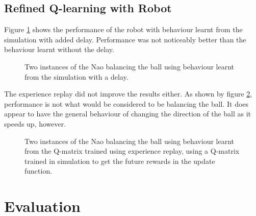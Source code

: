 \documentclass[12pt,a4paper]{article}
\begin{document}



\subsection{Refined Q-learning with Robot}
Figure \ref{delay_noer_1} shows the performance of the robot with behaviour learnt from the simulation with added delay. Performance was not noticeably better than the behaviour learnt without the delay. 
\begin{figure}[H]
	\centering
	\caption{Two instances of the Nao balancing the ball using behaviour learnt from the simulation with a delay.}
	\label{delay_noer_1}
\end{figure}

The experience replay did not improve the results either. As shown by figure \ref{er_nao}, performance is not what would be considered to be balancing the ball. It does appear to have the general behaviour of changing the direction of the ball as it speeds up, however. 
\begin{figure}[H]
	\centering
    \subfloat[Instance 1]{{\texttt{[image: 36\_er]} }}%
    \subfloat[Instance 2]{{\texttt{[image: 37\_er]} }}%
	\caption{Two instances of the Nao balancing the ball using behaviour learnt from the Q-matrix trained using experience replay, using a Q-matrix trained in simulation to get the future rewards in the update function.}
	\label{er_nao}
\end{figure}

\section{Evaluation}
\end{document}
